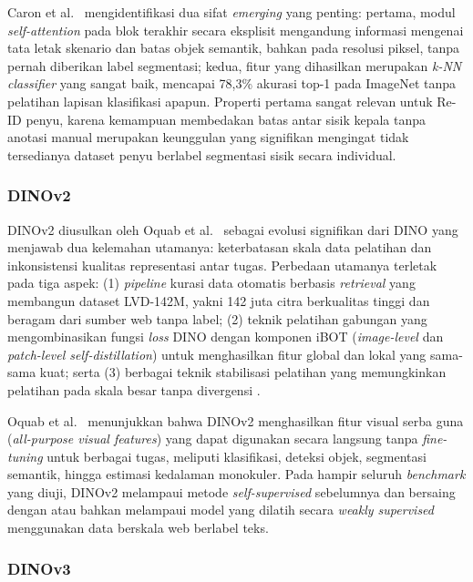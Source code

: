 Caron et al.\ \cite{caron2021dino} mengidentifikasi dua sifat \textit{emerging} yang penting: pertama, modul \textit{self-attention} pada blok terakhir secara eksplisit mengandung informasi mengenai tata letak skenario dan batas objek semantik, bahkan pada resolusi piksel, tanpa pernah diberikan label segmentasi; kedua, fitur yang dihasilkan merupakan \textit{k-NN classifier} yang sangat baik, mencapai 78{,}3\% akurasi top-1 pada ImageNet tanpa pelatihan lapisan klasifikasi apapun. Properti pertama sangat relevan untuk Re-ID penyu, karena kemampuan membedakan batas antar sisik kepala tanpa anotasi manual merupakan keunggulan yang signifikan mengingat tidak tersedianya dataset penyu berlabel segmentasi sisik secara individual.

\subsubsection{DINOv2}
 
DINOv2 diusulkan oleh Oquab et al.\ \cite{oquab2023dinov2} sebagai evolusi signifikan dari DINO yang menjawab dua kelemahan utamanya: keterbatasan skala data pelatihan dan inkonsistensi kualitas representasi antar tugas. Perbedaan utamanya terletak pada tiga aspek: (1) \textit{pipeline} kurasi data otomatis berbasis \textit{retrieval} yang membangun dataset LVD-142M, yakni 142 juta citra berkualitas tinggi dan beragam dari sumber web tanpa label; (2) teknik pelatihan gabungan yang mengombinasikan fungsi \textit{loss} DINO dengan komponen iBOT (\textit{image-level} dan \textit{patch-level self-distillation}) untuk menghasilkan fitur global dan lokal yang sama-sama kuat; serta (3) berbagai teknik stabilisasi pelatihan yang memungkinkan pelatihan pada skala besar tanpa divergensi \cite{oquab2023dinov2}.
 
Oquab et al.\ \cite{oquab2023dinov2} menunjukkan bahwa DINOv2 menghasilkan fitur visual serba guna (\textit{all-purpose visual features}) yang dapat digunakan secara langsung tanpa \textit{fine-tuning} untuk berbagai tugas, meliputi klasifikasi, deteksi objek, segmentasi semantik, hingga estimasi kedalaman monokuler. Pada hampir seluruh \textit{benchmark} yang diuji, DINOv2 melampaui metode \textit{self-supervised} sebelumnya dan bersaing dengan atau bahkan melampaui model yang dilatih secara \textit{weakly supervised} menggunakan data berskala web berlabel teks.
 
\subsubsection{DINOv3}
 
